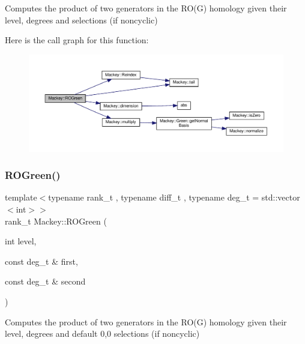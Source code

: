 Computes the product of two generators in the R\+O(\+G) homology given their level, degrees and selections (if noncyclic) 

Here is the call graph for this function\+:\nopagebreak
\begin{figure}[H]
\begin{center}
\leavevmode
\includegraphics[width=350pt]{namespaceMackey_a2bd86833844ca62d76c47a54aeb0bb77_cgraph}
\end{center}
\end{figure}
\mbox{\label{namespaceMackey_a07d3b1e748c6cf2fd8a6e21b948a0afe}} 
\subsubsection{\texorpdfstring{R\+O\+Green()}{ROGreen()}\hspace{0.1cm}{\footnotesize\ttfamily [2/2]}}
{\footnotesize\ttfamily template$<$typename rank\+\_\+t , typename diff\+\_\+t , typename deg\+\_\+t  = std\+::vector$<$int$>$$>$ \\
rank\+\_\+t Mackey\+::\+R\+O\+Green (\begin{DoxyParamCaption}\item[{int}]{level,  }\item[{const deg\+\_\+t \&}]{first,  }\item[{const deg\+\_\+t \&}]{second }\end{DoxyParamCaption})\hspace{0.3cm}{\ttfamily [inline]}}



Computes the product of two generators in the R\+O(\+G) homology given their level, degrees and default 0,0 selections (if noncyclic) 

\mbox{\label{namespaceMackey_a58708ee937b0c4172b7cde8e5f856504}} 
